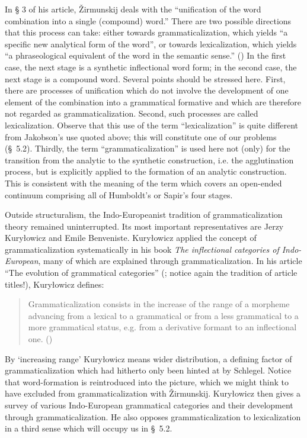 In § 3 of his article, Žirmunskij deals with the “unification of the word combination into a single (compound) word.” There are two possible directions that this process can take: either towards grammaticalization, which yields “a specific new analytical form of the word”, or towards lexicalization, which yields “a phraseological equivalent of the word in the semantic sense.” (\citeyear[83]{Žirmunskij1966}) In the first case, the next stage is a synthetic inflectional word form; in the second case, the next stage is a compound word. Several points should be stressed here. First, there are processes of unification which do not involve the development of one element of the combination into a grammatical formative and which are therefore not regarded as grammaticalization. Second, such processes are called lexicalization. Observe that this use of the term “lexicalization” is quite different from Jakobson's use quoted above; this will constitute one of our problems (§~5.2). Thirdly, the term ``grammaticalization'' is used here not (only) for the transition from the analytic to the synthetic construction, i.e. the agglutination process, but is explicitly applied to the formation of an analytic construction. This is consistent with the meaning of the term which covers an open-ended continuum comprising all of Humboldt's or Sapir's four stages.

Outside structuralism, the Indo-Europeanist tradition of grammaticalization theory remained uninterrupted. Its most important representatives are Jerzy Kuryłowicz and Emile Benveniste. Kuryłowicz applied the concept of grammaticalization systematically in his book \textit{The inflectional categories of Indo-European}, many of which are explained through grammaticalization. In his article “The evolution of grammatical categories” (\citeyear{Kuryłowicz1965}; notice again the tradition of article titles!), Kuryłowicz defines:

\begin{quote} \label{quote:kurylowciz}
Grammaticalization consists in the increase of the range of a morpheme advancing from a lexical to a grammatical or from a less grammatical to a more grammatical status, e.g. from a derivative formant to an inflectional one. (\citeyear[52]{Kuryłowicz1965})
\end{quote}

\noindent By ‘increasing range’ Kuryłowicz means wider distribution, a defining factor of grammaticalization which had hitherto only been hinted at by Schlegel. Notice that word-formation is reintroduced into the picture, which we might think to have excluded from grammaticalization with Žirmunskij. Kuryłowicz then gives a survey of various Indo-European grammatical categories and their development through grammaticalization. He also opposes grammaticalization to lexicalization in a third sense which will occupy us in §~5.2.

